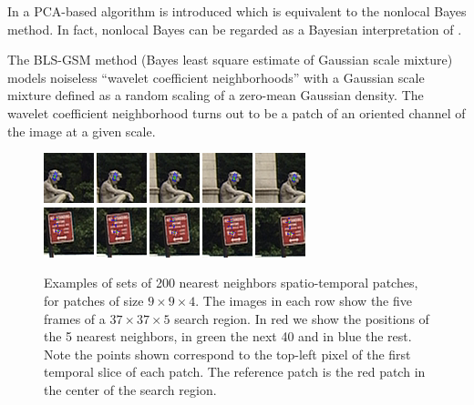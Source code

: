\documentclass[10pt, journal, twocolumn, final, a4paper]{IEEEtran}
\begin{document}
In \cite{Zhang2010} a PCA-based algorithm is introduced which is equivalent to 
the nonlocal Bayes method. In fact, nonlocal Bayes can be regarded as a Bayesian 
interpretation of \cite{Zhang2010}.

The BLS-GSM method \cite{Portilla2003} (Bayes least square estimate of Gaussian
scale mixture) models noiseless ``wavelet coefficient neighborhoods'' with a
Gaussian scale mixture defined as a random scaling of a zero-mean Gaussian
density. The wavelet coefficient neighborhood turns out to be a patch of an
oriented channel of the image at a given scale.




\begin{figure}[htpb!]
	\centering
	\includegraphics[width = .8\textwidth]{figs/patch_groups/patch_group_bus_045_085_012_s40_wx37_wt2_sx9_st4_r040_n200_coor.png}\\
	\vspace{.2cm}
	\includegraphics[width = .8\textwidth]{figs/patch_groups/patch_group_bus_255_056_010_s40_wx37_wt2_sx9_st4_r040_n200_coor.png}
	\caption{Examples of sets of 200 nearest neighbors spatio-temporal patches,
	for patches of size $9\times 9\times 4$.
	The images in each row show the five frames of a $37\times37\times5$ search region. 
	In red we show the positions of the 5 nearest neighbors, in green the next 40 and in blue the rest.
	Note the points shown correspond to the top-left pixel of the first temporal
	slice of each patch.
	The reference patch is the red patch in the center of the search region.}
	\label{fig:patch_groups_pos}
\end{figure}
\end{document}
